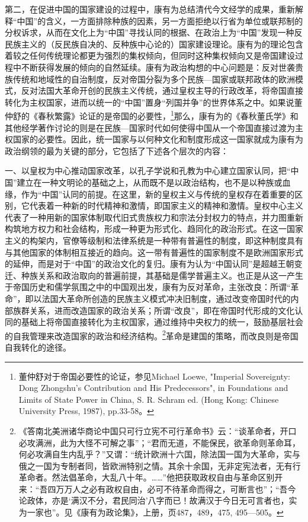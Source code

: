 \documentclass[a4paper, 12pt, openright]{ctexbook}
\begin{document}
第二，在促进中国的国家建设的过程中，康有为总结清代今文经学的成果，重新解释“中国”的含义，一方面排除种族的因素，另一方面拒绝以行省为单位或联邦制的分权诉求，从而在文化上为“中国”寻找认同的根据、在政治上为“中国”发现一种反民族主义的（反民族自决的、反种族中心论的）国家建设理论。康有为的理论包含着较之任何传统理论都更为强烈的集权倾向，但同时这种集权倾向又是帝国建设过程中不断获得发展的倾向的自然延续。康有为政治构想的中心问题是：反对世袭贵族传统和地域性的自治制度，反对帝国分裂为多个民族—国家或联邦政体的欧洲模式，反对法国大革命开创的民族主义传统，通过皇权主导的行政改革，将帝国直接转化为主权国家，进而以统一的“中国”置身“列国并争”的世界体系之中。如果说董仲舒的《春秋繁露》论证的是帝国的必要性，\footnote{董仲舒对于帝国必要性的论证，参见Michael Loewe, "Imperial Sovereignty: Dong Zhongshu's Contribution and His Predecessors", in Foundations and Limits of State Power in China, S. R. Schram ed. (Hong Kong: Chinese University Press, 1987), pp.33-58。}那么，康有为的《春秋董氏学》和其他经学著作讨论的则是在民族—国家时代如何使得中国从一个帝国直接过渡为主权国家的必要性。因此，统一国家与以何种文化和制度形成这一国家就成为康有为政治纲领的最为关键的部分，它包括了下述各个层次的内容：

一、以皇权为中心推动国家改革，以孔子学说和孔教为中心建立国家认同，把“中国”建立在一种文明论的基础之上，从而既不是以政治结构，也不是以种族或血缘，作为“中国”认同的前提。在这里，新的皇权主义与传统的皇权存在着重要的区别，它代表着一种新的时代精神和激情，即国家主义的精神和激情。皇权中心主义代表了一种用新的国家体制取代旧式贵族权力和宗法分封权力的特点，并力图重新构筑地方权力和社会结构，形成一种更为形式化、趋同化的政治形式。在这一国家主义的构架内，官僚等级制和法律系统是一种带有普遍性的制度，即这种制度具有与其他国家的体制相互接近的趋向。这一带有普遍性的国家制度不是欧洲国家形式的延伸，而是对于“中国”的政治文化的复归。康有为认为“中国认同”是超越王朝变迁、种族关系和政治取向的普遍前提，其基础是儒学普遍主义。也正是从这一产生于帝国历史和儒学氛围之中的中国观出发，康有为反对革命，主张改良：所谓“革命”，即以法国大革命所创造的民族主义模式冲决旧制度，通过改变帝国时代的内部族群关系，进而改造国家的政治关系；所谓“改良”，即在帝国时代形成的文化认同的基础上将帝国直接转化为主权国家，通过维持中央权力的统一，鼓励基层社会的自我管理来改造国家的政治和经济结构。\footnote{《答南北美洲诸华商论中国只可行立宪不可行革命书》云：“谈革命者，开口必攻满洲，此为大怪不可解之事”；“君而无道，不能保民，欲革命则革命耳，何必攻满自生内乱乎？”又谓：“统计欧洲十六国，除法国一国为大革命，实与俄之一国为专制者同，皆欧洲特别之情。其余十余国，无非定宪法者，无有行革命者。然法倡革命，大乱八十年。……”他把获取政权自由与革命区别开来：“吾四万万人之必有政权自由，必可不待革命而得之，可断言也”；“吾今论政体，亦是‘满汉不分，君民同治’八字而已！故满汉于今日无可言者也，实为一家也”。见《康有为政论集》，上册，页487，489，475, 495—505。}革命是建国的策略，而改良则是帝国自我转化的途径。
\end{document}
